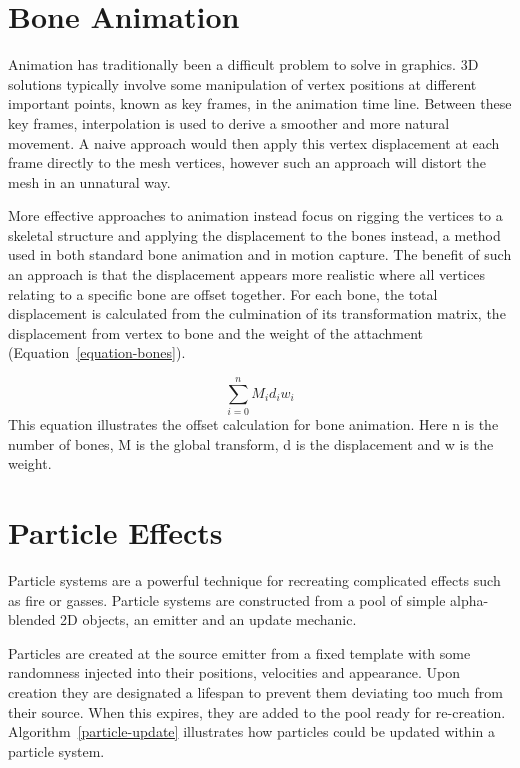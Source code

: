 \documentclass[a4paper, oneside, 11pt]{report}
\begin{document}
\section{Bone Animation}
Animation has traditionally been a difficult problem to solve in graphics. 3D solutions typically involve some manipulation of vertex positions at different important points, known as key frames, in the animation time line. Between these key frames, interpolation is used to derive a smoother and more natural movement. A naive approach would then apply this vertex displacement at each frame directly to the mesh vertices, however such an approach will distort the mesh in an unnatural way. 

More effective approaches to animation instead focus on rigging the vertices to a skeletal structure and applying the displacement to the bones instead, a method used in both standard bone animation and in motion capture. The benefit of such an approach is that the displacement appears more realistic where all vertices relating to a specific bone are offset together. For each bone, the total displacement is calculated from the culmination of its transformation matrix, the displacement from vertex to bone and the weight of the attachment (Equation~\ref{equation-bones}).

\begin{equation}
    \sum_{i=0}^n M_i d_i w_i\label{equation-bones}
\end{equation}
This equation illustrates the offset calculation for bone animation. Here n is the number of bones, M is the global transform, d is the displacement and w is the weight.

\section{Particle Effects}
Particle systems are a powerful technique for recreating complicated effects such as fire or gasses. Particle systems are constructed from a pool of simple alpha-blended 2D objects, an emitter and an update mechanic.

Particles are created at the source emitter from a fixed template with some randomness injected into their positions, velocities and appearance. Upon creation they are designated a lifespan to prevent them deviating too much from their source. When this expires, they are added to the pool ready for re-creation. Algorithm~\ref{particle-update} illustrates how particles could be updated within a particle system.
\end{document}
